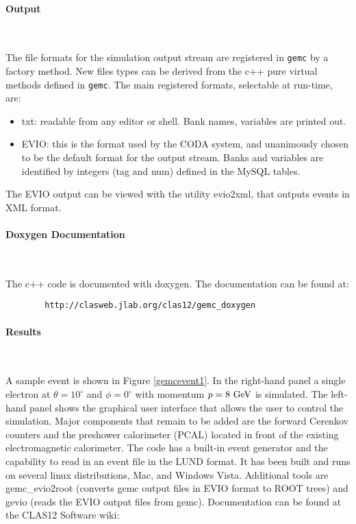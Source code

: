 \paragraph{Output}

~~

\vskip 0.3cm

\noindent
The file formats for the simulation output stream are registered in {\tt gemc} 
by a factory method. New files types can be derived from the c++ pure virtual 
methods defined in {\tt gemc}. The main registered formats, selectable at 
run-time, are:

\begin{itemize}
\item txt: readable from any editor or shell. Bank names, variables are 
printed out.
\item EVIO: this is the format used by the CODA system, and unanimously 
chosen to be the default format for the output stream. Banks and variables 
are identified by integers (tag and num) defined in the MySQL tables.
\end{itemize}

The EVIO output can be viewed with the utility evio2xml, that outputs events 
in XML format.

\paragraph{Doxygen Documentation}

~~

\vskip 0.3cm

The c++ code is documented with doxygen. The documentation can be found at:

\begin{verbatim}
        http://clasweb.jlab.org/clas12/gemc_doxygen
\end{verbatim}

\paragraph{Results}

~~

\vskip 0.3cm

A sample event is shown in Figure \ref{gemcevent1}.
In the right-hand panel a single electron at $\theta = 10^\circ$ and $\phi = 0^\circ$ with momentum $p = 8~\rm GeV$ is simulated.
The left-hand panel shows the graphical user interface that allows the user to control the simulation.
Major components that remain to be added are the forward Cerenkov counters and the preshower calorimeter (PCAL) located in front of the existing electromagnetic calorimeter.
The code has a built-in event generator and the capability to read in an event file in the LUND format.
It has been built and runs on several linux distributions, Mac, and Windows Vista.
Additional tools are gemc\_evio2root (converts gemc output files in EVIO format to ROOT trees) and gevio (reads the EVIO output files from gemc).
Documentation can be found at the CLAS12 Software wiki:

